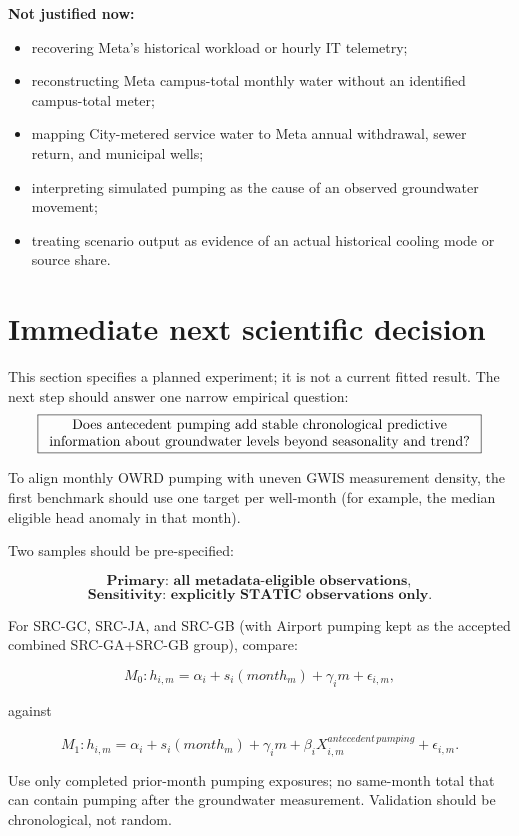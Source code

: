 \documentclass[11pt]{article}
\begin{document}
\textbf{Not justified now:}
\begin{itemize}
\item recovering Meta's historical workload or hourly IT telemetry;
\item reconstructing Meta campus-total monthly water without an identified campus-total meter;
\item mapping City-metered service water to Meta annual withdrawal, sewer return, and municipal wells;
\item interpreting simulated pumping as the cause of an observed groundwater movement;
\item treating scenario output as evidence of an actual historical cooling mode or source share.
\end{itemize}

\section{Immediate next scientific decision}

This section specifies a planned experiment; it is not a current fitted result. The next step should answer one narrow empirical question:
\[
\boxed{\parbox{0.90\linewidth}{\centering
Does antecedent pumping add stable chronological predictive information about groundwater levels beyond seasonality and trend?}}
\]

To align monthly OWRD pumping with uneven GWIS measurement density, the first benchmark should use one target per well-month (for example, the median eligible head anomaly in that month).

Two samples should be pre-specified:

\[
\textbf{Primary: all metadata-eligible observations},
\]
\[
\textbf{Sensitivity: explicitly STATIC observations only}.
\]

For SRC-GC, SRC-JA, and SRC-GB (with Airport pumping kept as the accepted combined SRC-GA+SRC-GB group), compare:

\[
M_0:
h_{i,m}
=
\alpha_i+s_i(month_m)+\gamma_i m+\epsilon_{i,m},
\]

against

\[
M_1:
h_{i,m}
=
\alpha_i+s_i(month_m)+\gamma_i m+\beta_iX^{antecedent\,pumping}_{i,m}+\epsilon_{i,m}.
\]

Use only completed prior-month pumping exposures; no same-month total that can contain pumping after the groundwater measurement. Validation should be chronological, not random.
\end{document}

